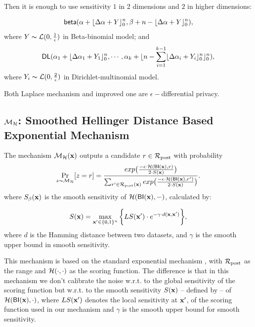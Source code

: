 \documentclass{article}
\begin{document}
 Then it is enough to use sensitivity $1$ in 2 dimensions and $2$ in higher dimensions:

 \[
 \mathsf{beta}(\alpha +  \lfloor{\Delta \alpha + Y}\rfloor^n_0,\beta + n - \lfloor{\Delta \alpha + Y}\rfloor^n_0),
 \]
 where $Y \thicksim \mathcal{L}(0, \frac{1}{\epsilon})$ in Beta-binomial model; and
 \[
 \mathsf{DL}(\alpha_1 +  \lfloor{\Delta \alpha_1 + Y_1}\rfloor^n_0, \cdots, \alpha_k + \lfloor n - \sum_{i = 1}^{k-1}\lfloor{\Delta \alpha_i + Y_i}\rfloor^n_0 \rfloor^n_0),
 \]
where $Y_i \thicksim \mathcal{L}(0, \frac{2}{\epsilon})$ in Dirichlet-multinomial model.

Both Laplace mechanism and improved one are $\epsilon -$differential privacy\cite{dwork2014algorithmic}.


\subsection{$\mathcal{M}_{\mathcal{H}}$: Smoothed Hellinger Distance Based Exponential Mechanism}
\label{subsec_hexpmech}

\begin{definition}
\label{def_smoo}
The mechanism $\mathcal{M}_{\mathcal{H}}(\textbf{x})$ outputs a candidate $r \in \mathcal{R}_{\textup{post}}$ with probability
\begin{equation*}
\underset{z \thicksim \mathcal{M}_{\mathcal{H}}}{\Pr}[z=r] = \frac {exp\big(\frac{-\epsilon\cdot\mathcal{H}(\mathsf{BI}(\textbf{x}),r)}{2\cdot S(\textbf{x})}\big)}
{\sum_{r'\in \mathcal{R}_{\textup{post}}(\textbf{x})} exp \big(\frac{-\epsilon\cdot \mathcal{H} (\mathsf{BI}(\textbf{x}),r')}{2 \cdot S(\textbf{x})}\big)}.
\end{equation*}
where $S_\beta(\textbf{x})$ is the smooth sensitivity of $\mathcal{H}(\mathsf{BI}(\textbf{x}),-)$, calculated by:

\begin{equation}
  \label{eq:smooth}
   S(\textbf{x})=\max_{\textbf{x}' \in \{0,1\}^{n}}\bigg \{LS(\textbf{x}') \cdot e^{-\gamma\cdot d(\textbf{x},\textbf{x}')}\bigg\},
\end{equation}
where $d$ is the Hamming distance between two datasets, and $\gamma$ is the smooth upper bound in smooth sensitivity.
\end{definition}

This mechanism is based on the standard exponential mechanism
\cite{talwar}, with $\mathcal{R}_{\textup{post}}$ as the range and
$\mathcal{H}(\cdot,\cdot)$ as the scoring function. The difference is
that in this mechanism we don't calibrate the noise w.r.t. to the
global sensitivity of the scoring function but w.r.t. to the smooth
sensitivity $S(\textbf{x})$ -- defined by \cite{nissim2007smooth}-- of
$\mathcal{H}(\mathsf{BI}(\textbf{x}), \cdot)$, where $LS(\textbf{x}')$ denotes the local
sensitivity at $\textbf{x}'$, of the scoring function used in our mechanism and  $\gamma$ is the smooth upper bound for smooth sensitivity.
\end{document}
